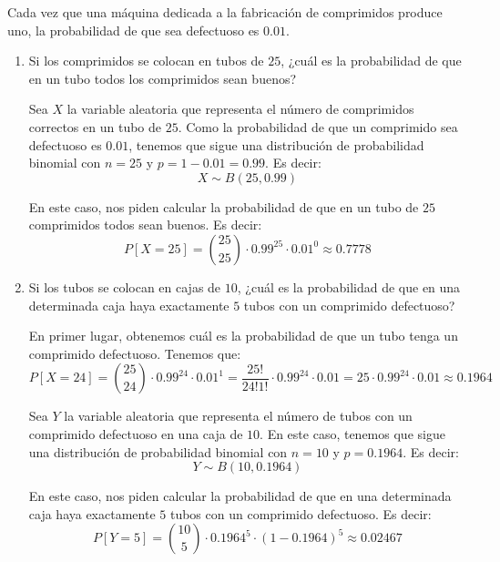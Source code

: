\begin{ejercicio}
    Cada vez que una máquina dedicada a la fabricación de comprimidos produce uno, la probabilidad
    de que sea defectuoso es $0.01$.
    \begin{enumerate}
        \item Si los comprimidos se colocan en tubos de $25$, ¿cuál es la probabilidad de que en un tubo todos
        los comprimidos sean buenos?

        Sea $X$ la variable aleatoria que representa el número de comprimidos correctos en un tubo de $25$. Como la probabilidad de que un comprimido sea defectuoso es $0.01$, tenemos que sigue una distribución de probabilidad binomial con $n=25$ y $p=1-0.01=0.99$. Es decir:
        \begin{equation*}
            X \sim B(25,0.99)
        \end{equation*}

        En este caso, nos piden calcular la probabilidad de que en un tubo de $25$ comprimidos todos sean buenos. Es decir:
        \begin{equation*}
            P[X=25] = \binom{25}{25} \cdot 0.99^{25} \cdot 0.01^0 \approx 0.7778
        \end{equation*}

        \item Si los tubos se colocan en cajas de $10$, ¿cuál es la probabilidad de que en una determinada caja
        haya exactamente $5$ tubos con un comprimido defectuoso?

        En primer lugar, obtenemos cuál es la probabilidad de que un tubo tenga un comprimido defectuoso. Tenemos que:
        \begin{equation*}
            P[X=24] = \binom{25}{24} \cdot 0.99^{24} \cdot 0.01^1 = \dfrac{25!}{24!1!} \cdot 0.99^{24} \cdot 0.01 = 25 \cdot 0.99^{24} \cdot 0.01 \approx 0.1964
        \end{equation*}

        Sea $Y$ la variable aleatoria que representa el número de tubos con un comprimido defectuoso en una caja de $10$. En este caso, tenemos que sigue una distribución de probabilidad binomial con $n=10$ y $p=0.1964$. Es decir:
        \begin{equation*}
            Y \sim B(10,0.1964)
        \end{equation*}

        En este caso, nos piden calcular la probabilidad de que en una determinada caja haya exactamente $5$ tubos con un comprimido defectuoso. Es decir:
        \begin{equation*}
            P[Y=5] = \binom{10}{5} \cdot 0.1964^5 \cdot (1-0.1964)^5 \approx 0.02467
        \end{equation*}
    \end{enumerate}
\end{ejercicio}

